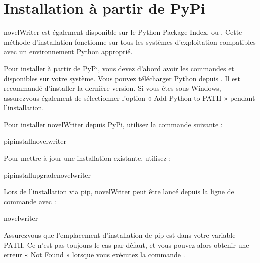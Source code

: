 \documentclass[a4paper,11pt,french]{sphinxmanual}
\begin{document}
\section{Installation à partir de PyPi}
\label{\detokenize{int_started:installing-from-pypi}}\label{\detokenize{int_started:a-started-pip}}
\sphinxAtStartPar
novelWriter est également disponible sur le Python Package Index, ou . Cette méthode d’installation fonctionne sur tous les systèmes d’exploitation compatibles avec un environnement Python approprié.

\sphinxAtStartPar
Pour installer à partir de PyPi, vous devez d’abord avoir les commandes  et  disponibles sur votre système. Vous pouvez télécharger Python depuis . Il est recommandé d’installer la dernière version. Si vous êtes sous Windows, assurez\sphinxhyphen{}vous également de sélectionner l’option « Add Python to PATH » pendant l’installation.

\sphinxAtStartPar
Pour installer novelWriter depuis PyPi, utilisez la commande suivante :

\begin{sphinxVerbatim}[commandchars=\\\{\}]
pipinstallnovelwriter
\end{sphinxVerbatim}

\sphinxAtStartPar
Pour mettre à jour une installation existante, utilisez :

\begin{sphinxVerbatim}[commandchars=\\\{\}]
pipinstall\PYGZhy{}\PYGZhy{}upgradenovelwriter
\end{sphinxVerbatim}

\sphinxAtStartPar
Lors de l’installation via pip, novelWriter peut être lancé depuis la ligne de commande avec :

\begin{sphinxVerbatim}[commandchars=\\\{\}]
novelwriter
\end{sphinxVerbatim}

\sphinxAtStartPar
Assurez\sphinxhyphen{}vous que l’emplacement d’installation de pip est dans votre variable PATH. Ce n’est pas toujours le cas par défaut, et vous pouvez alors obtenir une erreur « Not Found » lorsque vous exécutez la commande .
\end{document}
